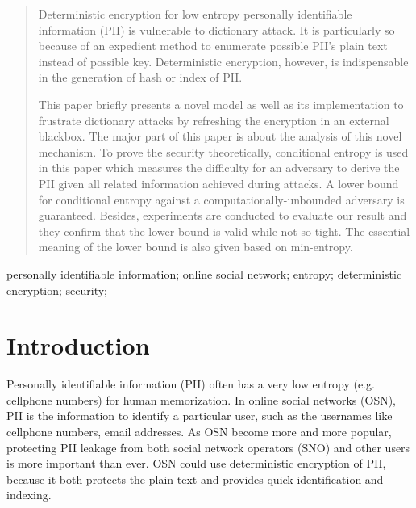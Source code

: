 \documentclass[10pt, conference, compsocconf]{IEEEtran}
\begin{document}




\maketitle


\begin{abstract}
	Deterministic encryption for low entropy personally identifiable information
	(PII) is vulnerable 
	to dictionary attack. It is particularly so because 
	of an expedient method to enumerate possible PII's 
	plain text instead of possible key.
	Deterministic encryption, however, 
	is indispensable in the generation of hash or index of PII.
	
	This paper briefly presents a novel model as well as
	its implementation to frustrate dictionary attacks
	by refreshing the encryption in an external blackbox.	
	The major part of this paper is about the analysis
	of this novel mechanism.
	To prove the security  theoretically,
	conditional entropy is used in this paper which
	measures the difficulty for an adversary to
	derive the PII given all related information achieved during attacks.
	A lower bound for conditional entropy
	against a computationally-unbounded adversary is guaranteed.
	Besides, experiments are conducted to evaluate our result and
	they confirm that the lower bound is valid while not so tight.
	The essential meaning of the lower bound is also
	given based on min-entropy.
	
\end{abstract}

\begin{IEEEkeywords}
personally identifiable information; online social network; entropy; deterministic encryption;
security;

\end{IEEEkeywords}


%
\IEEEpeerreviewmaketitle



\section{Introduction}
	Personally identifiable information (PII) often has
	a very low entropy (e.g. cellphone numbers) for human memorization.
	In online social networks (OSN), PII is the information
	to identify a particular user, such as the usernames like cellphone numbers,
	email addresses.	
	As OSN become more and more popular,
	protecting PII leakage from both social network operators (SNO)
	and other users is more important than ever.
	OSN could use deterministic encryption of PII,
	because it both protects the plain text and provides quick identification
	and indexing.
\end{document}
